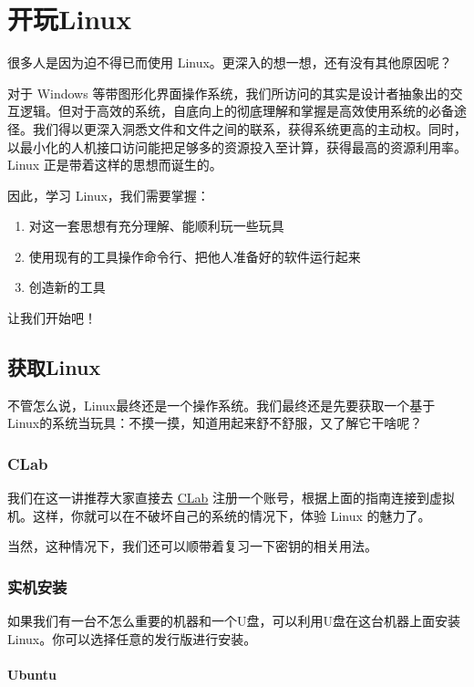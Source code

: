 \documentclass[../main.tex]{subfiles}
\begin{document}
\chapter{开玩Linux}\label{chap:play-with-linux}

很多人是因为迫不得已而使用 Linux。更深入的想一想，还有没有其他原因呢？

对于 Windows 等带图形化界面操作系统，我们所访问的其实是设计者抽象出的交互逻辑。但对于高效的系统，自底向上的彻底理解和掌握是高效使用系统的必备途径。我们得以更深入洞悉文件和文件之间的联系，获得系统更高的主动权。同时，以最小化的人机接口访问能把足够多的资源投入至计算，获得最高的资源利用率。Linux 正是带着这样的思想而诞生的。

因此，学习 Linux，我们需要掌握：

\begin{enumerate}
    \item 对这一套思想有充分理解、能顺利玩一些玩具
    \item 使用现有的工具操作命令行、把他人准备好的软件运行起来
    \item 创造新的工具
\end{enumerate}

让我们开始吧！

\section{获取Linux}

不管怎么说，Linux最终还是一个操作系统。我们最终还是先要获取一个基于Linux的系统当玩具：不摸一摸，知道用起来舒不舒服，又了解它干啥呢？

\subsection{CLab}

我们在这一讲推荐大家直接去 \href{https://clab.pku.edu.cn/}{CLab} 注册一个账号，根据上面的指南连接到虚拟机。这样，你就可以在不破坏自己的系统的情况下，体验 Linux 的魅力了。

当然，这种情况下，我们还可以顺带着复习一下密钥的相关用法。

\subsection{实机安装}

如果我们有一台不怎么重要的机器和一个U盘，可以利用U盘在这台机器上面安装Linux。你可以选择任意的发行版进行安装。

\subsubsection{Ubuntu}
\end{document}
